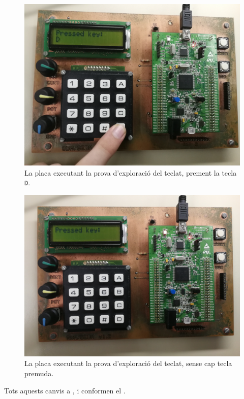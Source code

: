 \begin{figure}[p] %
  \begin{center}
    \includegraphics[width=.82\columnwidth]{../photos/board/c1-key-d}
  \end{center}
  \caption{ \label{fig:c1-board-key-d} La placa executant la prova d'exploració del teclat, prement la tecla \texttt{D}. }
\end{figure}
\begin{figure}[p]
  \begin{center}
    \includegraphics[width=.82\columnwidth]{../photos/board/c1-key-initial}
  \end{center}
  \caption{ \label{fig:c1-board-key-initial} La placa executant la prova d'exploració del teclat, sense cap tecla premuda. }
\end{figure}

Tots aquests canvis a ,  i 
conformen el .


